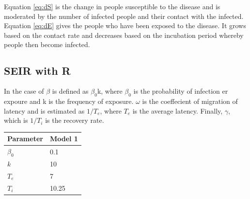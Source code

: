 \documentclass{article}\usepackage[]{graphicx}\usepackage[]{color}
\begin{document}
Equation \ref{eq:dS} is the change in people susceptible to the disease and is moderated by the number of infected people and their contact with the infected. Equation \ref{eq:dE} gives the people who have been exposed to the disease. It grows based on the contact rate and decreases based on the incubation period whereby people then become infected.

\subsection{SEIR with R}

In the case of $\beta$ is defined as $\beta_0$k, where $\beta_0$ is the probability of infection er expoure and k is the frequency of exposure. $\omega$ is the coeffecient of migration of latency and is estimated as $1/T_e$, where $T_e$ is the average latency. Finally, $\gamma$, which is $1/T_i$ is the recovery rate.

\begin{table}
\begin{tabular}{ll}\hline
Parameter     &  Model 1 \\  \hline\hline
$\beta_0$     & 0.1     \\
$k$           & 10      \\
$T_e$         & 7       \\
$T_i$         & 10.25 \\
\hline
\end{tabular}
\end{table}
\end{document}

